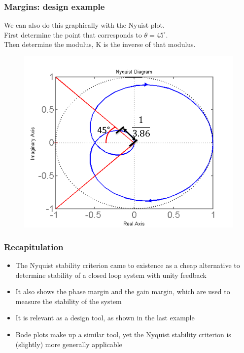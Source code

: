 \begin{frame}
	\frametitle{Margins: design example}
	We can also do this graphically with the Nyuist plot.\\
	\medskip
	First determine the point that corresponds to $\theta = 45^{\circ}$.\\
	Then determine the modulus, K is the inverse of that modulus.
	\vspace{-2ex}
	\begin{figure}
		\includegraphics[width=0.6\linewidth]{design_example}
	\end{figure}
\end{frame}

\begin{frame}
	\frametitle{Recapitulation}
	\vspace{-6ex}
	\begin{itemize}
		\item The Nyquist stability criterion came to existence as a cheap alternative to determine stability of a closed loop system with unity feedback
		\item It also shows the phase margin and the gain margin, which are used to measure the stability of the system
		\item It is relevant as a design tool, as shown in the last example
		\item Bode plots make up a similar tool, yet the Nyquist stability criterion is (slightly) more generally applicable
	\end{itemize}
\end{frame}
